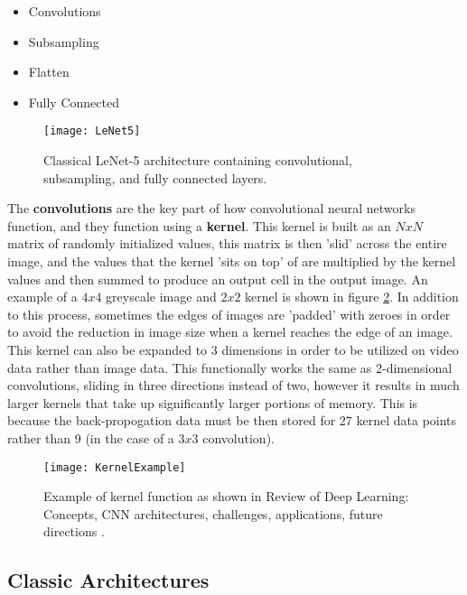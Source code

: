 \begin{itemize}
	\item Convolutions
	\item Subsampling
	\item Flatten
	\item Fully Connected
\end{itemize}

\begin{figure}[ht]
	\texttt{[image: LeNet5]}
	\centering
	\caption{Classical LeNet-5 architecture \cite{lenet5} containing convolutional, subsampling, and fully connected layers.}
	\label{fig:lenet5}
\end{figure}

The \textbf{convolutions} are the key part of how convolutional neural networks function, and they function using a \textbf{kernel}. This kernel is built as an $NxN$ matrix of randomly initialized values, this matrix is then 'slid' across the entire image, and the values that the kernel 'sits on top' of are multiplied by the kernel values and then summed to produce an output cell in the output image. An example of a $4x4$ greyscale image and $2x2$ kernel is shown in figure \ref{fig:kernel-example}. In addition to this process, sometimes the edges of images are 'padded' with zeroes in order to avoid the reduction in image size when a kernel reaches the edge of an image. This kernel can also be expanded to 3 dimensions in order to be utilized on video data rather than image data. This functionally works the same as 2-dimensional convolutions, sliding in three directions instead of two, however it results in much larger kernels that take up significantly larger portions of memory. This is because the back-propogation data must be then stored for 27 kernel data points rather than 9 (in the case of a $3x3$ convolution).

\begin{figure}[ht]
	\texttt{[image: KernelExample]}
	\centering
	\caption{Example of kernel function as shown in Review of Deep Learning: Concepts, CNN architectures, challenges, applications, future directions \cite{2021cnnreview}.}
	\label{fig:kernel-example}
\end{figure}

\subsection{Classic Architectures}
\label{sec:classic-cnn}

